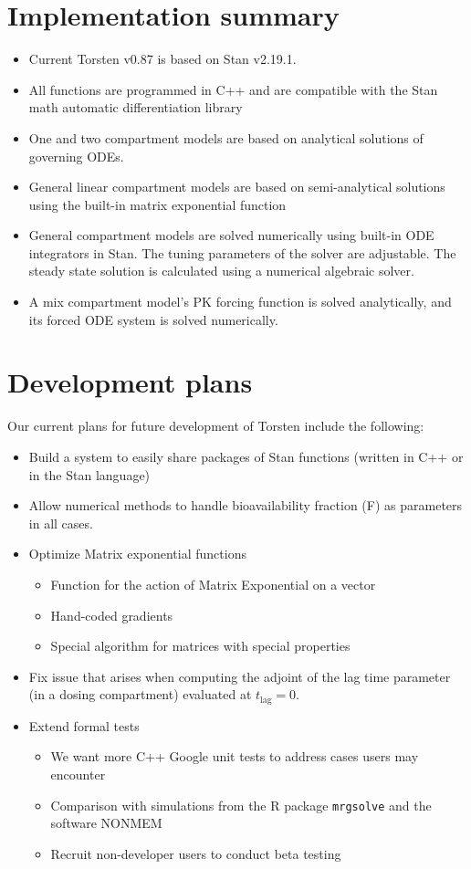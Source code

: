 \documentclass[11pt, reqno, oneside]{amsbook}
\numberwithin{equation}{chapter}
\numberwithin{figure}{chapter}
\numberwithin{table}{chapter}
\theoremstyle{remark}
\begin{document}
\section{Implementation summary}
\label{sec:orgb6de665}
\begin{itemize}
\item Current Torsten v0.87 is based on Stan v2.19.1.
\item All functions are programmed in C++ and are compatible
with the Stan math automatic differentiation library \cite{carpenter15_stan_math_librar}
\item One and two compartment models are based on analytical solutions of governing ODEs.
\item General linear compartment models are based on semi-analytical solutions using the built-in matrix exponential function
\item General compartment models are solved numerically using built-in ODE integrators in Stan. The tuning parameters of the solver are adjustable. The steady state solution is calculated using a numerical algebraic solver.
\item A mix compartment model's PK forcing function is solved
analytically, and its forced ODE system is solved
numerically.
\end{itemize}

\section{Development plans}
\label{sec:org1a50588}
Our current plans for future development of Torsten include the
following:
\begin{itemize}
\item Build a system to easily share packages of Stan functions
(written in C++ or in the Stan language)
\item Allow numerical methods to handle
bioavailability fraction (F) as parameters in all cases.
\item Optimize Matrix exponential functions
\begin{itemize}
\item Function for the action of Matrix Exponential on a vector
\item Hand-coded gradients
\item Special algorithm for matrices with special properties
\end{itemize}
\item Fix issue that arises when computing the adjoint of the lag time
parameter (in a dosing compartment) evaluated at \(t_{\text{lag}} = 0\).
\item Extend formal tests
\begin{itemize}
\item We want more C++ Google unit tests to address cases users may
encounter
\item Comparison with simulations from the R package
\texttt{mrgsolve} and the software NONMEM\textregistered{}
\item Recruit non-developer users to conduct beta testing
\end{itemize}
\end{itemize}
\end{document}
